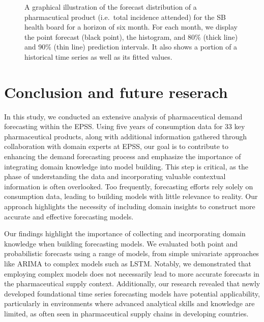 \documentclass[
  authoryear,
  preprint,
  3p]{elsarticle}
\begin{document}
\begin{figure}[H]


\caption{\label{fig-forecast-density-hstep}A graphical illustration of
the forecast distribution of a pharmacutical product (i.e.~total
incidence attended) for the SB health board for a horizon of six month.
For each month, we display the point forecast (black point), the
histogram, and 80\% (thick line) and 90\% (thin line) prediction
intervals. It also shows a portion of a historical time series as well
as its fitted values.}

\end{figure}%

\section{Conclusion and future reserach}\label{sec-conclusion}

In this study, we conducted an extensive analysis of pharmaceutical
demand forecasting within the EPSS. Using five years of consumption data
for 33 key pharmaceutical products, along with additional information
gathered through collaboration with domain experts at EPSS, our goal is
to contribute to enhancing the demand forecasting process and emphasize
the importance of integrating domain knowledge into model building. This
step is critical, as the phase of understanding the data and
incorporating valuable contextual information is often overlooked. Too
frequently, forecasting efforts rely solely on consumption data, leading
to building models with little relevance to reality. Our approach
highlights the necessity of including domain insights to construct more
accurate and effective forecasting models.

Our findings highlight the importance of collecting and incorporating
domain knowledge when building forecasting models. We evaluated both
point and probabilistic forecasts using a range of models, from simple
univariate approaches like ARIMA to complex models such as LSTM.
Notably, we demonstrated that employing complex models does not
necessarily lead to more accurate forecasts in the pharmaceutical supply
context. Additionally, our research revealed that newly developed
foundational time series forecasting models have potential
applicability, particularly in environments where advanced analytical
skills and knowledge are limited, as often seen in pharmaceutical supply
chains in developing countries.
\end{document}
